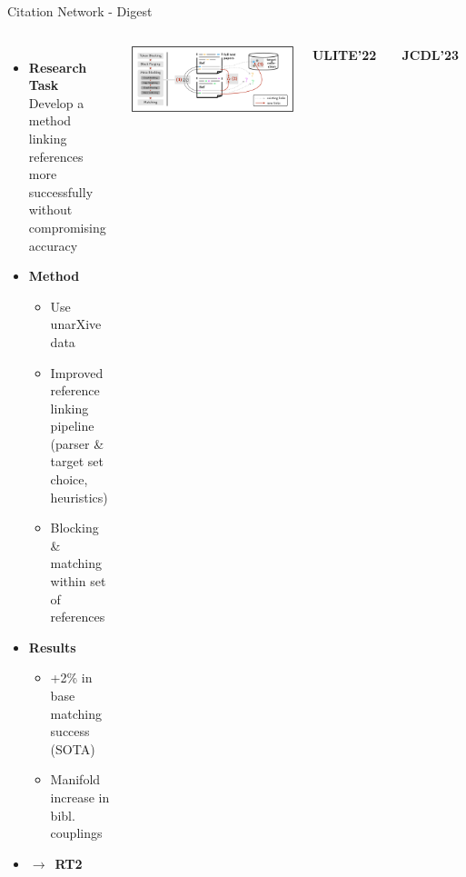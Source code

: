 \documentclass[en,16:9,smallfoot]{sdqbeamer}
\newcommand{\rtmark}[1]{%
    \textbf{{\color{objblue-box}\faCrosshairs}\,RT#1}%
}
\begin{document}
   \begin{frame}{Citation Network - Digest}

   \begin{columns}
        \begin{itemize}
            \item \textbf{Research Task}\\Develop a method linking references more successfully without compromising accuracy
            \item \textbf{Method}
            \begin{itemize}
                \item Use unarXive data
                \item Improved reference linking pipeline\\(parser \& target set choice, heuristics)
                \item Blocking \& matching within set of references
            \end{itemize}
            \item \textbf{Results}
            \begin{itemize}
                \item +2\% in base matching success (SOTA)
                \item Manifold increase in bibl. couplings
            \end{itemize}
            \item $\rightarrow$ \rtmark{2\large\checkmark}
        \end{itemize}
            \includegraphics[width=\linewidth]{imgs/blocking_schema}
           \begin{infobox-pub-small}
           \textbf{ULITE'22}~\cite{Saier2022ULITE}
           \end{infobox-pub-small}
           \vspace{-0.5em}
           \begin{infobox-pub-small}
           \textbf{JCDL'23}~\cite{Saier2023unarXive}
           \end{infobox-pub-small}
   \end{columns}
   \end{frame}
\end{document}
